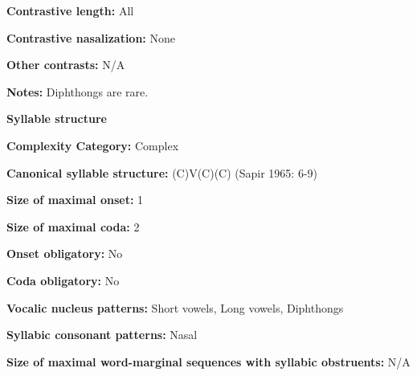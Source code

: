\begin{styleBody}
\textbf{Contrastive length:} All
\end{styleBody}

\begin{styleBody}
\textbf{Contrastive nasalization:} None
\end{styleBody}

\begin{styleBody}
\textbf{Other contrasts:} N/A
\end{styleBody}

\begin{styleBody}
\textbf{Notes: }Diphthongs are rare.
\end{styleBody}

\begin{styleBody}
\textbf{Syllable structure}
\end{styleBody}

\begin{styleBody}
\textbf{Complexity Category:} Complex
\end{styleBody}

\begin{styleBody}
\textbf{Canonical syllable structure:} (C)V(C)(C)\textbf{ }(Sapir 1965: 6-9)
\end{styleBody}

\begin{styleBody}
\textbf{Size of maximal onset:} 1
\end{styleBody}

\begin{styleBody}
\textbf{Size of maximal coda:} 2
\end{styleBody}

\begin{styleBody}
\textbf{Onset obligatory:} No
\end{styleBody}

\begin{styleBody}
\textbf{Coda obligatory:} No
\end{styleBody}

\begin{styleBody}
\textbf{Vocalic nucleus patterns:} Short vowels, Long vowels, Diphthongs
\end{styleBody}

\begin{styleBody}
\textbf{Syllabic consonant patterns:} Nasal
\end{styleBody}

\begin{styleBody}
\textbf{Size of maximal word{}-marginal sequences with syllabic obstruents:} N/A
\end{styleBody}

